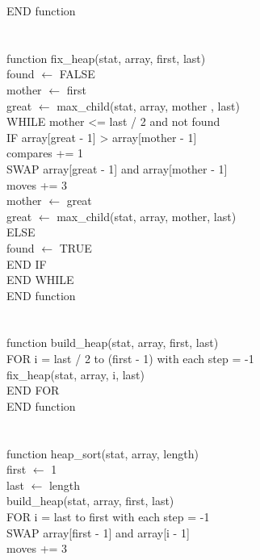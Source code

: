 \documentclass[12pt]{article}
\begin{document}
END function \\
\\
\\
function fix\_heap(stat, array, first, last) \\
\indent found $\leftarrow$ FALSE \\
\indent mother $\leftarrow$ first \\
\indent great $\leftarrow$ max\_child(stat, array, mother , last) \\
\indent WHILE mother <= last / 2 and not found \\
\indent \indent IF array[great - 1] > array[mother - 1] \\
\indent \indent \indent compares += 1 \\
\indent \indent \indent SWAP array[great - 1] and array[mother - 1] \\
\indent \indent \indent moves += 3 \\
\indent \indent \indent mother $\leftarrow$ great \\
\indent \indent \indent great $\leftarrow$ max\_child(stat, array, mother, last) \\
\indent \indent ELSE \\
\indent \indent \indent found $\leftarrow$ TRUE \\
\indent \indent END IF \\
\indent END WHILE \\
END function \\
\\
\\
function build\_heap(stat, array, first, last) \\
\indent FOR i = last / 2 to (first - 1) with each step = -1\\
\indent \indent fix\_heap(stat, array, i, last) \\
\indent END FOR \\
END function \\
\\
\\
function heap\_sort(stat, array, length) \\
\indent first $\leftarrow$ 1 \\
\indent last $\leftarrow$ length \\
\indent build\_heap(stat, array, first, last) \\
\indent FOR i = last to first with each step = -1\\
\indent \indent SWAP array[first - 1] and array[i - 1] \\
\indent \indent moves += 3 \\
\end{document}
